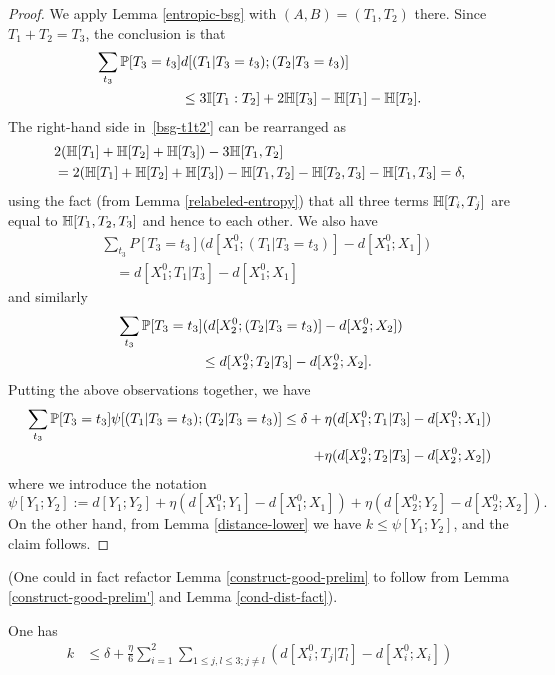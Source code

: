 \begin{proof} \leanok
  We apply Lemma \ref{entropic-bsg} with $(A,B) = (T_1, T_2)$ there.
  Since $T_1 + T_2 = T_3$, the conclusion is that
  \begin{align} \nonumber \sum_{t_3} \mathbb{P}[T_3 = t_3] & d[(T_1 | T_3 = t_3); (T_2 | T_3 = t_3)] \\ & \leq 3 \mathbb{I}[T_1 : T_2] + 2 \mathbb{H}[T_3] - \mathbb{H}[T_1] - \mathbb{H}[T_2].\label{bsg-t1t2'}
  \end{align}
  The right-hand side in~\eqref{bsg-t1t2'} can be rearranged as
  \begin{align*} & 2( \mathbb{H}[T_1] + \mathbb{H}[T_2] + \mathbb{H}[T_3]) - 3 \mathbb{H}[T_1,T_2] \\ & = 2(\mathbb{H}[T_1] + \mathbb{H}[T_2] + \mathbb{H}[T_3]) - \mathbb{H}[T_1,T_2] - \mathbb{H}[T_2,T_3] - \mathbb{H}[T_1, T_3] = \delta,\end{align*}
  using the fact (from Lemma \ref{relabeled-entropy}) that all three terms $\mathbb{H}[T_i,T_j]$ are equal to $\mathbb{H}[T_1,T_2,T_3]$ and hence to each other.
  We also have
  \begin{align*}
  &  \sum_{t_3} P[T_3 = t_3] \bigl(d[X^0_1; (T_1 | T_3=t_3)] - d[X^0_1;X_1]\bigr) \\
  &\quad = d[X^0_1; T_1 | T_3] - d[X^0_1;X_1]
  \end{align*}
  and similarly
  \begin{align*}
  &  \sum_{t_3} \mathbb{P}[T_3 = t_3] (d[X^0_2;(T_2 | T_3=t_3)] - d[X^0_2; X_2]) \\
  &\quad\quad\quad\quad\quad\quad \leq d[X^0_2;T_2|T_3] - d[X^0_2;X_2].
  \end{align*}
  Putting the above observations together, we have
  \begin{align*}
   \sum_{t_3} \mathbb{P}[T_3=t_3] \psi[(T_1 | T_3=t_3); (T_2 | T_3=t_3)] \leq \delta + \eta (d[X^0_1;T_1|T_3]-d[X^0_1;X_1]) \\
     + \eta (d[X^0_2;T_2|T_3]-d[X^0_2;X_2])
   \end{align*}
where we introduce the notation
\[\psi[Y_1; Y_2] := d[Y_1;Y_2] +  \eta (d[X_1^0;Y_1] - d[X_1^0;X_1]) + \eta(d[X_2^0;Y_2] - d[X_2^0;X_2]).\]
On the other hand, from Lemma \ref{distance-lower} we have $k \leq \psi[Y_1;Y_2]$, and the claim follows.
\end{proof}

(One could in fact refactor Lemma \ref{construct-good-prelim} to follow from Lemma \ref{construct-good-prelim'} and Lemma \ref{cond-dist-fact}).

\begin{lemma}\label{construct-good'}
One has
\begin{align*}  k & \leq  \delta + \frac{\eta}{6}  \sum_{i=1}^2 \sum_{1 \leq j,l \leq 3; j \neq l} (d[X^0_i;T_j|T_l] - d[X^0_i; X_i])
  \end{align*}
\end{lemma}

